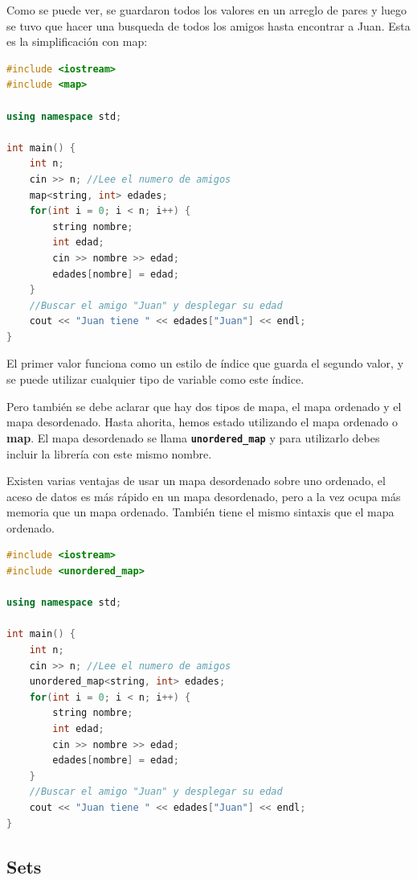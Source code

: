 \documentclass{article}
\begin{document}
Como se puede ver, se guardaron todos los valores en un arreglo de pares y luego se tuvo que hacer una busqueda de todos los amigos hasta encontrar a Juan. Esta es la simplificación con map:

\begin{lstlisting}[language=C++, caption=Implementación con map]
#include <iostream>
#include <map>

using namespace std;

int main() {
    int n;
    cin >> n; //Lee el numero de amigos
    map<string, int> edades;
    for(int i = 0; i < n; i++) {
        string nombre;
        int edad;
        cin >> nombre >> edad;
        edades[nombre] = edad;
    }
    //Buscar el amigo "Juan" y desplegar su edad
    cout << "Juan tiene " << edades["Juan"] << endl;
}
\end{lstlisting}

El primer valor funciona como un estilo de índice que guarda el segundo valor, y se puede utilizar cualquier tipo de variable como este índice.

Pero también se debe aclarar que hay dos tipos de mapa, el mapa ordenado y el mapa desordenado. Hasta ahorita, hemos estado utilizando el mapa ordenado o \textbf{map}. El mapa desordenado se llama \textbf{\lstinline{unordered_map}} y para utilizarlo debes incluir la librería con este mismo nombre.

Existen varias ventajas de usar un mapa desordenado sobre uno ordenado, el aceso de datos es más rápido en un mapa desordenado, pero a la vez ocupa más memoria que un mapa ordenado. También tiene el mismo sintaxis que el mapa ordenado.

\begin{lstlisting}[language=C++, caption=Mapa desordenado]
#include <iostream>
#include <unordered_map>

using namespace std;

int main() {
    int n;
    cin >> n; //Lee el numero de amigos
    unordered_map<string, int> edades;
    for(int i = 0; i < n; i++) {
        string nombre;
        int edad;
        cin >> nombre >> edad;
        edades[nombre] = edad;
    }
    //Buscar el amigo "Juan" y desplegar su edad
    cout << "Juan tiene " << edades["Juan"] << endl;
}
\end{lstlisting}

\subsection{Sets}
\end{document}
